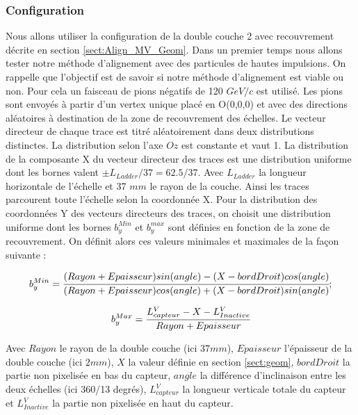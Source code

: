   \subsubsection{Configuration}
  \label{sect:configMV}
  
   Nous allons utiliser la configuration de la double couche 2 avec recouvrement d\'ecrite en section \ref{sect:Align_MV_Geom}. Dans un premier temps nous allons tester notre m\'ethode d'alignement avec des particules de hautes impulsions. On rappelle que l'objectif est de savoir si notre m\'ethode d'alignement est viable ou non. Pour cela un faisceau de pions n\'egatifs de 120 $GeV/c$ est utilis\'e. Les pions sont envoy\'es \`a partir d'un vertex unique plac\'e en O(0,0,0) et avec des directions al\'eatoires \`a destination de la zone de recouvrement des \'echelles. Le vecteur directeur de chaque trace est titr\'e al\'eatoirement dans deux distributions distinctes. La distribution selon l'axe $Oz$ est constante et vaut 1. La distribution de la composante X du vecteur directeur des traces est une distribution uniforme dont les bornes valent $\pm L_{Ladder}/37 = 62.5/37$. Avec $L_{Ladder}$ la longueur horizontale de l'\'echelle et 37 $mm$ le rayon de la couche. Ainsi les traces parcourent toute l'\'echelle selon la coordonn\'ee X. Pour la distribution des coordonn\'ees Y des vecteurs directeurs des traces, on choisit une distribution uniforme dont les bornes $b_y^{Min}$ et $b_y^{max}$ sont d\'efinies en fonction de la zone de recouvrement. On d\'efinit alors ces valeurs minimales et maximales de la façon suivante :
   
   \begin{equation}
   b_y^{Min} =  \cfrac{ (Rayon+Epaisseur) sin(angle) - (X-bordDroit) cos(angle) }{ (Rayon+Epaisseur) cos(angle) + (X-bordDroit) sin(angle) };
   \end{equation}

   \begin{equation}
   b_y^{Max} =  \cfrac{ L_{capteur}^V-X-L_{Inactive}^V}{Rayon+Epaisseur}
   \end{equation}

   Avec $Rayon$ le rayon de la double couche (ici $37 mm$), $Epaisseur$ l'\'epaisseur de la double couche (ici $2 mm$), $X$ la valeur d\'efinie en section \ref{sect:geom}, $bordDroit$ la partie non pixelis\'ee en bas du capteur, $angle$ la diff\'erence d'inclinaison entre les deux \'echelles (ici 360/13 degr\'es), $L_{capteur}^V$ la longueur verticale totale du capteur et $L_{Inactive}^V$ la partie non pixelis\'ee en haut du capteur.
   
